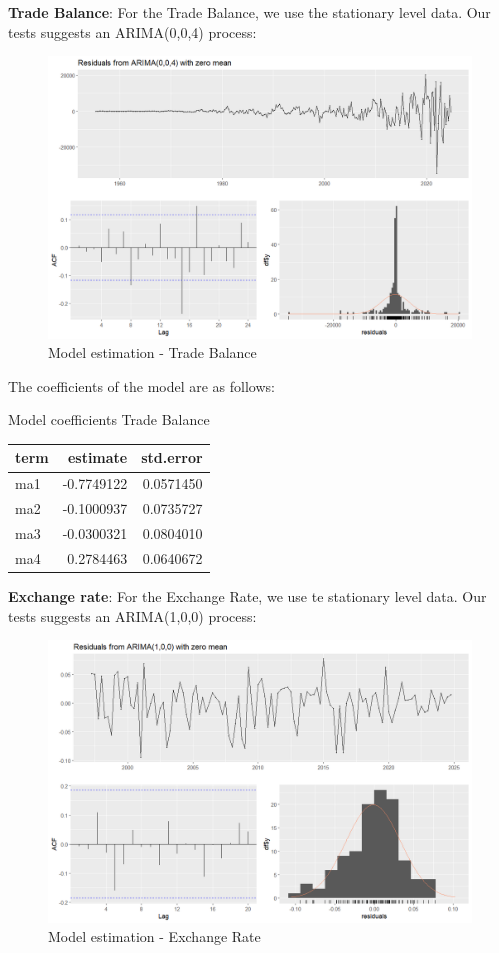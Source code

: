 \documentclass[
]{article}
\begin{document}
\textbf{Trade Balance}: For the Trade Balance, we use the stationary
level data. Our tests suggests an ARIMA(0,0,4) process:

\begin{figure}

{\centering \includegraphics[width=0.8\linewidth]{../results/Trade Balance_residuals} 

}

\caption{Model estimation - Trade Balance}\label{fig:unnamed-chunk-10}
\end{figure}

The coefficients of the model are as follows:

\bgroup \table[H]
\centering
\caption{\label{tab:unnamed-chunk-11}Model coefficients Trade Balance}
\centering
\begin{tabular}[t]{lrr}
\toprule
term & estimate & std.error\\
\midrule
ma1 & -0.7749122 & 0.0571450\\
ma2 & -0.1000937 & 0.0735727\\
ma3 & -0.0300321 & 0.0804010\\
ma4 & 0.2784463 & 0.0640672\\
\bottomrule
\end{tabular}
\endtable\egroup

\textbf{Exchange rate}: For the Exchange Rate, we use te stationary
level data. Our tests suggests an ARIMA(1,0,0) process:

\begin{figure}

{\centering \includegraphics[width=0.8\linewidth]{../results/Exchange Rate_residuals} 

}

\caption{Model estimation - Exchange Rate}\label{fig:unnamed-chunk-12}
\end{figure}
\end{document}
